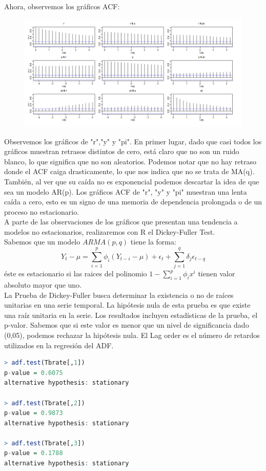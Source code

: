\documentclass[a4paper,]{article}
\begin{document}
\vspace{5mm}


Ahora, observemos los gráficos ACF:

\begin{figure}[h!]
    \centering
    \includegraphics[scale=0.65]{ACF.png}
\end{figure}

Observemos los gráficos de "r","y" y "pi". En primer lugar, dado que casi todos los gráficos muestran retrasos distintos de cero, está claro que no son un ruido blanco, lo que significa que no son aleatorios. Podemos notar que no hay retraso donde el ACF caiga drasticamente, lo que nos indica que no se trata de MA(q). También, al ver que su caída no es exponencial podemos descartar la idea de que sea un modelo AR(p). Los gráficos ACF de "r", "y" y "pi" muestran una lenta caída a cero, esto es un signo de una memoria de dependencia prolongada o de un proceso no estacionario.\\

A parte de las observaciones de los gráficos que presentan una tendencia a modelos no estacionarios, realizaremos con R el Dickey-Fuller Test.\\

Sabemos que un modelo $ARMA(p,q)$ tiene la forma:
$$ Y_t-\mu= \sum_{i=1}^{p}\phi_i(Y_{t-i}-\mu)+\epsilon_t+\sum_{j=1}^{q}\delta_j\epsilon_{t-q} $$
éste es estacionario si las raices del polinomio $1-\sum_{i=1}^{p}\phi_ix^i$ tienen valor absoluto mayor que uno. \\

La Prueba de Dickey-Fuller busca determinar la existencia o no de raíces unitarias en una serie temporal. La hipótesis nula de esta prueba es que existe una raíz unitaria en la serie. Los resultados incluyen estadísticas de la prueba, el p-valor. Sabemos que si este valor es menor que un nivel de significancia dado (0,05), podemos rechazar la hipótesis nula. El Lag order es el número de retardos utilizados en la regresión del ADF.
\begin{lstlisting}[language=R]
> adf.test(Tbrate[,1]) 
p-value = 0.6075
alternative hypothesis: stationary

> adf.test(Tbrate[,2])
p-value = 0.9873
alternative hypothesis: stationary

> adf.test(Tbrate[,3])
p-value = 0.1788
alternative hypothesis: stationary
\end{lstlisting}
\end{document}
